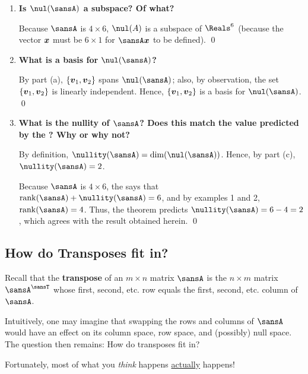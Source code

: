 \documentclass[12 pt]{article}
\begin{document}
{\begin{enumerate}[label=(\alph*),itemsep=6mm,listparindent=6mm,leftmargin=6mm]
		The null space of $\sansA$ is the span of all such vectors:
		\[
			\nul(\sansA)=\vsspan\{\vect{v}_1,\vect{v_2}\}.
		\]
		
		\vspace{-9mm}\qed
		
		\item \textbf{Is $\nul(\sansA)$ a subspace? Of what?}
		
		\ans Because $\sansA$ is $4\times 6$, $\nul(A)$ is a subspace of $\Reals^6$ (because the vector $\boldsymbol{x}$ must be $6\times 1$ for $\sansA\vect{x}$ to be defined). \qed
		
		\item \textbf{What is a basis for $\nul(\sansA)$?}
		
		\ans By part (a), $\{\boldsymbol{v}_1,\boldsymbol{v}_2\}$ spans $\nul(\sansA)$; also, by observation, the set $\{\boldsymbol{v}_1,\boldsymbol{v}_2\}$ is linearly independent. Hence, $\{\boldsymbol{v}_1,\boldsymbol{v}_2\}$ is a basis for $\nul(\sansA)$. \qed
		
		\item \textbf{What is the nullity of $\sansA$? Does this match the value predicted by the ? Why or why not?}
		
		\ans By definition, $\nullity(\sansA)=\dim(\nul(\sansA))$. Hence, by part (c), $\nullity(\sansA)=2$.
		
		Because $\sansA$ is $4\times 6$, the \textbf{} says that $\rank(\sansA)+\nullity(\sansA)=6$, and by examples 1 and 2, $\rank(\sansA)=4$. Thus, the theorem predicts $\nullity(\sansA)=6-4=2$, which agrees with the result obtained herein. \qed
	\end{enumerate}
}

\subsection*{\hspace{-6.5mm}How do Transposes fit in?}
Recall that the \textbf{transpose} of an $m\times n$ matrix $\sansA$ is the $n\times m$ matrix $\sansA^\sansT$ whose first, second, etc. row equals the first, second, etc. column of $\sansA$.

Intuitively, one may imagine that swapping the rows and columns of $\sansA$ would have an effect on its column space, row space, and (possibly) null space. The question then remains: How do transposes fit in?

Fortunately, most of what you \textit{think} happens \ul{actually} happens!
\end{document}
